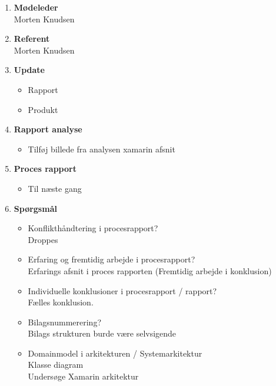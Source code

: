 	\begin{enumerate}
		\itemsep 0.3em 
		\item \textbf{Mødeleder}\\
			Morten Knudsen
		\item \textbf{Referent}\\
			Morten Knudsen

		\item \textbf{Update}
			\begin{itemize}[-]
				\item Rapport 
				\item Produkt
				
				
			\end{itemize}
		
		\item \textbf{Rapport analyse}
		\begin{itemize}[-]
			\item Tilføj billede fra analysen xamarin afsnit
			
		\end{itemize}
	
		\item \textbf{Proces rapport}
		\begin{itemize}[-]
			\item Til næste gang
		
		\end{itemize}
			
		\item \textbf{Spørgsmål}
			\begin{itemize}[-]
				\item Konflikthåndtering i procesrapport?\\
				Droppes
				\item Erfaring og fremtidig arbejde i procesrapport? \\
				Erfarings afsnit i proces rapporten (Fremtidig arbejde i konklusion)
				
				\item Individuelle konklusioner i procesrapport / rapport? \\
				Fælles konklusion.
				
				\item Bilagsnummerering? \\
				Bilags strukturen burde være selvsigende
				
				\item Domainmodel i arkitekturen / Systemarkitektur \\
				Klasse diagram \\
				Undersøge Xamarin arkitektur
								

\end{itemize}
\end{enumerate}

